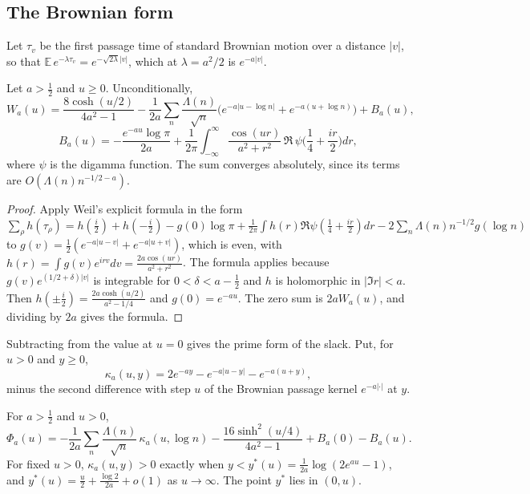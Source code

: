 \subsection{The Brownian form}

Let $\tau_v$ be the first passage time of standard Brownian motion over a distance $|v|$, so that $\mathbb E\,e^{-\lambda\tau_v}=e^{-\sqrt{2\lambda}|v|}$, which at $\lambda=a^2/2$ is $e^{-a|v|}$.

\begin{theorem}\label{mq:thm:brownian}
Let $a>\frac12$ and $u\ge0$. Unconditionally,
\[
W_a(u)=\frac{8\cosh(u/2)}{4a^2-1}-\frac1{2a}\sum_n\frac{\Lambda(n)}{\sqrt n}\Big(e^{-a|u-\log n|}+e^{-a(u+\log n)}\Big)+B_a(u),
\]
\[
B_a(u)=-\frac{e^{-au}\log\pi}{2a}+\frac1{2\pi}\int_{-\infty}^\infty\frac{\cos(ur)}{a^2+r^2}\,\Re\,\psi\Big(\frac14+\frac{ir}2\Big)dr,
\]
where $\psi$ is the digamma function. The sum converges absolutely, since its terms are $O(\Lambda(n)n^{-1/2-a})$.
\end{theorem}

\begin{proof}
Apply Weil's explicit formula \cite{Weil52} in the form $\sum_\rho h(\tau_\rho)=h(\frac i2)+h(-\frac i2)-g(0)\log\pi+\frac1{2\pi}\int h(r)\Re\psi(\frac14+\frac{ir}2)dr-2\sum_n\Lambda(n)n^{-1/2}g(\log n)$ to $g(v)=\frac12(e^{-a|u-v|}+e^{-a|u+v|})$, which is even, with $h(r)=\int g(v)e^{irv}dv=\frac{2a\cos(ur)}{a^2+r^2}$. The formula applies because $g(v)e^{(1/2+\delta)|v|}$ is integrable for $0<\delta<a-\frac12$ and $h$ is holomorphic in $|\Im r|<a$. Then $h(\pm\frac i2)=\frac{2a\cosh(u/2)}{a^2-1/4}$ and $g(0)=e^{-au}$. The zero sum is $2aW_a(u)$, and dividing by $2a$ gives the formula.
\end{proof}

Subtracting from the value at $u=0$ gives the prime form of the slack. Put, for $u>0$ and $y\ge0$,
\[
\kappa_a(u,y)=2e^{-ay}-e^{-a|u-y|}-e^{-a(u+y)},
\]
minus the second difference with step $u$ of the Brownian passage kernel $e^{-a|\cdot|}$ at $y$.

\begin{corollary}\label{mq:cor:primeslack}
For $a>\frac12$ and $u>0$,
\[
\Phi_a(u)=-\frac1{2a}\sum_n\frac{\Lambda(n)}{\sqrt n}\,\kappa_a(u,\log n)-\frac{16\sinh^2(u/4)}{4a^2-1}+B_a(0)-B_a(u).
\]
For fixed $u>0$, $\kappa_a(u,y)>0$ exactly when $y<y^*(u)=\frac1{2a}\log(2e^{au}-1)$, and $y^*(u)=\frac u2+\frac{\log2}{2a}+o(1)$ as $u\to\infty$. The point $y^*$ lies in $(0,u)$.
\end{corollary}

